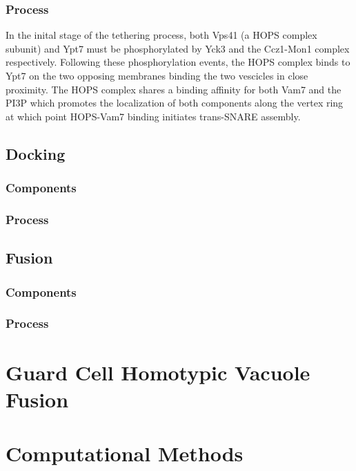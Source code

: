 \documentclass[12pt,twoside]{reedthesis}
\begin{document}
\subsection{Process}\label{process-1}

In the inital stage of the tethering process, both Vps41 (a HOPS complex subunit) and Ypt7 must be phosphorylated by Yck3 and the Ccz1-Mon1 complex respectively. Following these phosphorylation events, the HOPS complex binds to Ypt7 on the two opposing membranes binding the two vescicles in close proximity. The HOPS complex shares a binding affinity for both Vam7 and the PI3P which promotes the localization of both components along the vertex ring at which point HOPS-Vam7 binding initiates trans-SNARE assembly.

\section{Docking}\label{docking}

\subsection{Components}\label{components-2}

\subsection{Process}\label{process-2}

\section{Fusion}\label{fusion}

\subsection{Components}\label{components-3}

\subsection{Process}\label{process-3}

\chapter{Guard Cell Homotypic Vacuole Fusion}\label{GuardFusion}

\chapter{Computational Methods}\label{CompMethods}
\end{document}
